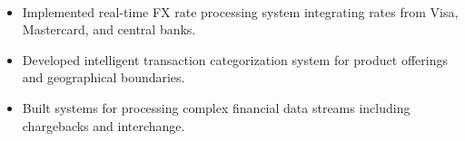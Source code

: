 \documentclass[a4paper,10pt]{article}
\begin{document}
{\begin{description}[
  leftmargin=1em,
  labelwidth=0pt,
  itemindent=0pt,
  listparindent=0pt,
  parsep=0.1cm,    %
  itemsep=0.1cm    %
]
  \item[\textbf{Core Infrastructure Services}]\mbox{}\\
  \vspace{-0.4cm}
    \begin{itemize}[leftmargin=1em, topsep=0pt]
      \item Implemented real-time FX rate processing system integrating rates from Visa, Mastercard, and central banks.
      \item Developed intelligent transaction categorization system for product offerings and geographical boundaries.
      \item Built systems for processing complex financial data streams including chargebacks and interchange.
    \end{itemize}
\end{description}
}
\end{document}
